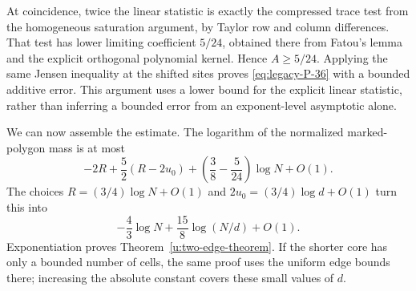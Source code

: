 At coincidence, twice the linear statistic is exactly the compressed
trace test from the homogeneous saturation argument, by Taylor row
and column differences.  That test has lower limiting coefficient
$5/24$, obtained there from Fatou's lemma and the explicit orthogonal
polynomial kernel.  Hence $A\ge5/24$.  Applying the same Jensen
inequality at the shifted sites proves \eqref{eq:legacy-P-36} with a bounded additive
error.  This argument uses a lower bound for the explicit linear
statistic, rather than inferring a bounded error from an exponent-level
asymptotic alone.



We can now assemble the estimate.  The logarithm of the normalized
marked-polygon mass is at most
\[
 -2R+\frac52(R-2u_0)
 +\left(\frac38-\frac5{24}\right)\log N+O(1).
\]
The choices $R=(3/4)\log N+O(1)$ and
$2u_0=(3/4)\log d+O(1)$ turn this into
\[
 -\frac43\log N+\frac{15}{8}\log(N/d)+O(1).
\]
Exponentiation proves Theorem~\ref{u:two-edge-theorem}.  If the shorter
core has only a bounded number of cells, the same proof uses the uniform
edge bounds there; increasing the absolute constant covers these
small values of $d$.
